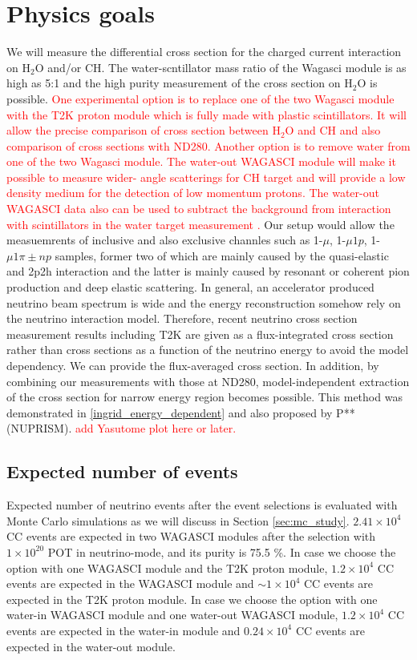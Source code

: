 \section{Physics goals}
We will measure the differential cross section for the charged current interaction on $\mathrm{H_2O}$ and/or CH.
The water-scntillator mass ratio of the Wagasci module is as high as 5:1 and the high purity measurement
of the cross section on $\mathrm{H_2O}$ is possible.
\textcolor{red}{One experimental option is to replace one of the two Wagasci module with the T2K proton module
  which is fully made with plastic scintillators. It will allow the precise comparison
  of cross section between $\mathrm{H_2O}$ and CH and also comparison of cross sections with ND280.}
  \textcolor{red}{Another option is to remove water from one of the two Wagasci module. 
The water-out WAGASCI module will make it possible to measure wider- angle scatterings for CH target and will provide a low density medium for the detection of low momentum protons.
The water-out WAGASCI data also can be used to subtract the background from interaction with scintillators in the water target measurement .
}
Our setup would allow the measuemrents of inclusive and also exclusive channles such as
1-$\mu$, 1-$\mu 1p$, 1-$\mu 1\pi{\pm} np$ samples, former two of which are mainly caused by the quasi-elastic and
2p2h interaction and the latter is mainly caused by resonant or coherent pion production and deep elastic scattering.
In general, an accelerator produced neutrino beam spectrum is wide and the energy reconstruction
somehow rely on the neutrino interaction model.
Therefore, recent neutrino cross section measurement results including T2K are given as a flux-integrated cross section
rather than cross sections as a function of the neutrino energy to avoid the model dependency.
We can provide the flux-averaged cross section.
In addition, by combining our measurements with those at ND280, model-independent extraction of the cross section
for narrow energy region becomes possible.
This method was demonstrated in \ref{ingrid_energy_dependent} and also proposed by P** (NUPRISM).
\textcolor{red}{add Yasutome plot here or later.}


\subsection{Expected number of events}
Expected number of neutrino events after the event selections is evaluated with Monte Carlo simulations as we will discuss in Section \ref{sec:mc_study}.
$2.41 \times 10^{4}$ CC events are expected in two WAGASCI modules after the selection with $1\times 10^{20}$ POT in neutrino-mode, and its purity is 75.5 \%.
In case we choose the option with one WAGASCI module and the T2K proton module,  $1.2 \times 10^{4}$ CC events are expected in the WAGASCI module and $\sim 1\times 10^{4}$ CC events are expected in the T2K proton module.
In case we choose the option with one water-in WAGASCI module and one water-out WAGASCI module,  $1.2 \times 10^{4}$ CC events are expected in the water-in module and $0.24 \times 10^{4}$ CC events are expected in the water-out module.


